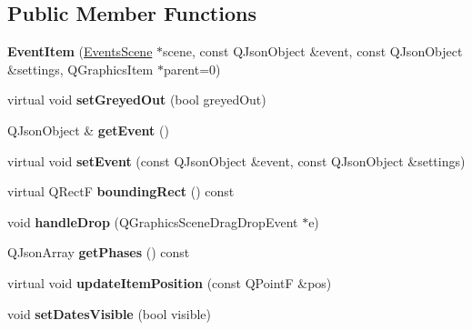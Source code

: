 \subsection*{Public Member Functions}
\begin{DoxyCompactItemize}
\item 
\hypertarget{class_event_item_af46c43b0e91c71f7ef6b73339e7448a7}{{\bfseries Event\-Item} (\hyperlink{class_events_scene}{Events\-Scene} $\ast$scene, const Q\-Json\-Object \&event, const Q\-Json\-Object \&settings, Q\-Graphics\-Item $\ast$parent=0)}\label{class_event_item_af46c43b0e91c71f7ef6b73339e7448a7}

\item 
\hypertarget{class_event_item_ae003daaad2df5018ef482d2c8cea53eb}{virtual void {\bfseries set\-Greyed\-Out} (bool greyed\-Out)}\label{class_event_item_ae003daaad2df5018ef482d2c8cea53eb}

\item 
\hypertarget{class_event_item_a64e350be35c91cd859593f7dcd3dd58d}{Q\-Json\-Object \& {\bfseries get\-Event} ()}\label{class_event_item_a64e350be35c91cd859593f7dcd3dd58d}

\item 
\hypertarget{class_event_item_a9c56664fcae93a3aa00c72a4aacbad95}{virtual void {\bfseries set\-Event} (const Q\-Json\-Object \&event, const Q\-Json\-Object \&settings)}\label{class_event_item_a9c56664fcae93a3aa00c72a4aacbad95}

\item 
\hypertarget{class_event_item_a4b454a72ab955cd6567ee64eae1b3ad7}{virtual Q\-Rect\-F {\bfseries bounding\-Rect} () const }\label{class_event_item_a4b454a72ab955cd6567ee64eae1b3ad7}

\item 
\hypertarget{class_event_item_a95ed697c06d055e08e61b62cba5fec0a}{void {\bfseries handle\-Drop} (Q\-Graphics\-Scene\-Drag\-Drop\-Event $\ast$e)}\label{class_event_item_a95ed697c06d055e08e61b62cba5fec0a}

\item 
\hypertarget{class_event_item_a158a87df084c005a27760a4f6c3361b5}{Q\-Json\-Array {\bfseries get\-Phases} () const }\label{class_event_item_a158a87df084c005a27760a4f6c3361b5}

\item 
\hypertarget{class_event_item_aed6d9222843c81ca70ae2610fd6dff95}{virtual void {\bfseries update\-Item\-Position} (const Q\-Point\-F \&pos)}\label{class_event_item_aed6d9222843c81ca70ae2610fd6dff95}

\item 
\hypertarget{class_event_item_a6ae4642ccc01771d5728dcf65c41214a}{void {\bfseries set\-Dates\-Visible} (bool visible)}\label{class_event_item_a6ae4642ccc01771d5728dcf65c41214a}

\end{DoxyCompactItemize}
